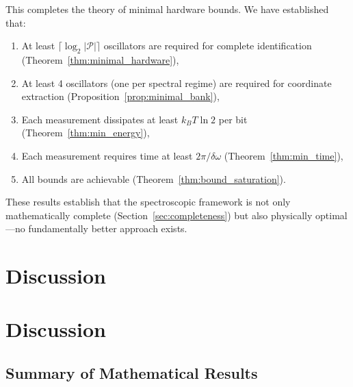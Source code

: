 \documentclass[twocolumn,10pt,a4paper]{article}
\theoremstyle{remark}
\newcommand{\partition}{\mathcal{P}}
\begin{document}
This completes the theory of minimal hardware bounds. We have established that:
\begin{enumerate}[label=(\alph*), noitemsep]
    \item At least $\lceil \log_2 |\partition| \rceil$ oscillators are required for complete identification (Theorem~\ref{thm:minimal_hardware}),
    \item At least 4 oscillators (one per spectral regime) are required for coordinate extraction (Proposition~\ref{prop:minimal_bank}),
    \item Each measurement dissipates at least $k_B T \ln 2$ per bit (Theorem~\ref{thm:min_energy}),
    \item Each measurement requires time at least $2\pi/\delta\omega$ (Theorem~\ref{thm:min_time}),
    \item All bounds are achievable (Theorem~\ref{thm:bound_saturation}).
\end{enumerate}

These results establish that the spectroscopic framework is not only mathematically complete (Section~\ref{sec:completeness}) but also physically optimal—no fundamentally better approach exists.



\section{Discussion}
\label{sec:discussion}

\section{Discussion}
\label{sec:discussion}

\subsection{Summary of Mathematical Results}
\end{document}
